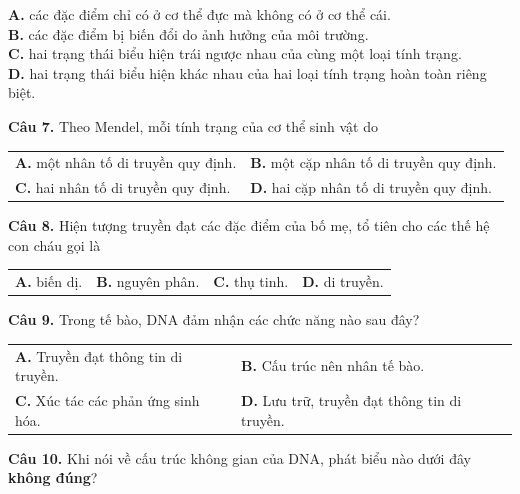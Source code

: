 \documentclass{article}
\begin{document}
\textbf{A.} các đặc điểm chỉ có ở cơ thể đực mà không có ở cơ thể cái.\\
\textbf{B.} các đặc điểm bị biến đổi do ảnh hưởng của môi trường.\\
\textbf{C.} hai trạng thái biểu hiện trái ngược nhau của cùng một loại tính trạng.\\
\textbf{D.} hai trạng thái biểu hiện khác nhau của hai loại tính trạng hoàn toàn riêng biệt.
\vspace*{\fill}
\newpage

\fontsize{26}{34}\selectfont
\textbf{Câu 7.} Theo Mendel, mỗi tính trạng của cơ thể sinh vật do
\vspace{6pt}

\begin{tabularx}{\linewidth}{@{}X X@{}}
\textbf{A.} một nhân tố di truyền quy định. & \textbf{B.} một cặp nhân tố di truyền quy định.\\[8pt]
\textbf{C.} hai nhân tố di truyền quy định. & \textbf{D.} hai cặp nhân tố di truyền quy định.
\end{tabularx}

\vspace*{\fill}

\textbf{Câu 8.} Hiện tượng truyền đạt các đặc điểm của bố mẹ, tổ tiên cho các thế hệ con cháu gọi là
\vspace{6pt}

\begin{tabularx}{\linewidth}{@{}X X X X@{}}
\textbf{A.} biến dị. & \textbf{B.} nguyên phân. & \textbf{C.} thụ tinh. & \textbf{D.} di truyền.
\end{tabularx}
\vspace*{\fill}
\newpage

\fontsize{25}{33}\selectfont
\textbf{Câu 9.} Trong tế bào, DNA đảm nhận các chức năng nào sau đây?
\vspace{6pt}

\begin{tabularx}{\linewidth}{@{}X X@{}}
\textbf{A.} Truyền đạt thông tin di truyền. & \textbf{B.} Cấu trúc nên nhân tế bào.\\[8pt]
\textbf{C.} Xúc tác các phản ứng sinh hóa. & \textbf{D.} Lưu trữ, truyền đạt thông tin di truyền.
\end{tabularx}

\vspace*{\fill}

\textbf{Câu 10.} Khi nói về cấu trúc không gian của DNA, phát biểu nào dưới đây \textbf{không đúng}?
\vspace{6pt}
\end{document}
